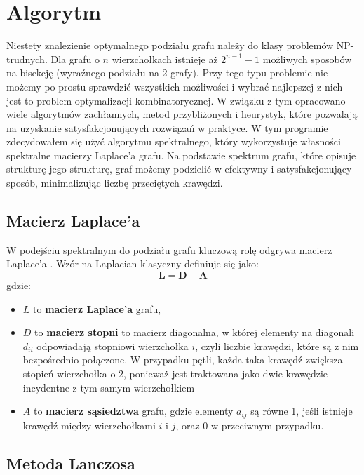 \documentclass{article}
\begin{document}
\section{Algorytm}

Niestety znalezienie optymalnego podziału grafu należy do klasy problemów NP-trudnych. Dla grafu o \( n \) wierzchołkach istnieje aż \( 2^{n-1} - 1 \) możliwych sposobów na bisekcję (wyraźnego podziału na 2 grafy). \cite{youtube_video} Przy tego typu problemie nie możemy po prostu sprawdzić wszystkich możliwości i wybrać najlepszej z nich - jest to problem optymalizacji kombinatorycznej. W związku z tym opracowano wiele algorytmów zachłannych, metod przybliżonych i heurystyk, które pozwalają na uzyskanie satysfakcjonujących rozwiązań w praktyce.
W tym programie zdecydowałem się użyć algorytmu spektralnego, który wykorzystuje własności spektralne macierzy Laplace'a grafu. Na podstawie spektrum grafu, które opisuje strukturę jego strukturę, graf możemy podzielić w efektywny i satysfakcjonujący sposób, minimalizując liczbę przeciętych krawędzi.



    \subsection{Macierz Laplace'a}
    
    W podejściu spektralnym do podziału grafu kluczową rolę odgrywa macierz Laplace'a \cite{laplacian_matrix}.
    Wzór na Laplacian klasyczny definiuje się jako:
    \[
    \mathbf{L} = \mathbf{D} - \mathbf{A}
    \]
    gdzie:
    \begin{itemize}
      \item \( L \) to \textbf{macierz Laplace'a} grafu,
      \item \( D \) to \textbf{macierz stopni} to macierz diagonalna, w której elementy na diagonali \( d_{ii} \) odpowiadają stopniowi wierzchołka \( i \), czyli liczbie krawędzi, które są z nim bezpośrednio połączone. W przypadku pętli, każda taka krawędź zwiększa stopień wierzchołka o 2, ponieważ jest traktowana jako dwie krawędzie incydentne z tym samym wierzchołkiem
      \item \( A \) to \textbf{macierz sąsiedztwa} grafu, gdzie elementy \( a_{ij} \) są równe 1, jeśli istnieje krawędź między wierzchołkami \( i \) i \( j \), oraz 0 w przeciwnym przypadku.
    \end{itemize}
    


    \subsection{Metoda Lanczosa}
\end{document}
